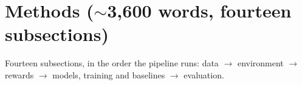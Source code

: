 
\section{Methods ($\sim$3,600 words, fourteen subsections)}\label{sec:methods}


\content
Fourteen subsections, in the order the pipeline runs: data $\to$ environment $\to$ rewards $\to$
models, training and baselines $\to$ evaluation.

